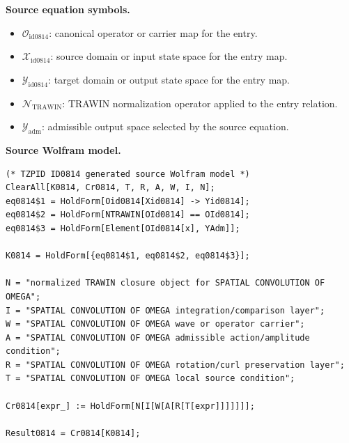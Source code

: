 \begin{minipage}[t]{0.49\linewidth}
\begingroup
\small
\raggedright
\textbf{Source equation symbols.}\par
\begin{itemize}[leftmargin=1.35em,itemsep=1pt,topsep=1pt,parsep=0pt]
    \item $\mathcal{O}_{\mathrm{id0814}}$: canonical operator or carrier map for the entry.
    \item $\mathcal{X}_{\mathrm{id0814}}$: source domain or input state space for the entry map.
    \item $\mathcal{Y}_{\mathrm{id0814}}$: target domain or output state space for the entry map.
    \item $\mathcal{N}_{\mathrm{TRAWIN}}$: TRAWIN normalization operator applied to the entry relation.
    \item $\mathcal{Y}_{\mathrm{adm}}$: admissible output space selected by the source equation.
\end{itemize}
\endgroup
\end{minipage}\hfill
\begin{minipage}[t]{0.47\linewidth}
\begingroup
\scriptsize
\raggedright
\textbf{Source Wolfram model.}\par
\begin{Verbatim}[fontsize=\tiny,breaklines=true,breakanywhere=true]
(* TZPID ID0814 generated source Wolfram model *)
ClearAll[K0814, Cr0814, T, R, A, W, I, N];
eq0814$1 = HoldForm[Oid0814[Xid0814] -> Yid0814];
eq0814$2 = HoldForm[NTRAWIN[OId0814] == OId0814];
eq0814$3 = HoldForm[Element[OId0814[x], YAdm]];

K0814 = HoldForm[{eq0814$1, eq0814$2, eq0814$3}];

N = "normalized TRAWIN closure object for SPATIAL CONVOLUTION OF OMEGA";
I = "SPATIAL CONVOLUTION OF OMEGA integration/comparison layer";
W = "SPATIAL CONVOLUTION OF OMEGA wave or operator carrier";
A = "SPATIAL CONVOLUTION OF OMEGA admissible action/amplitude condition";
R = "SPATIAL CONVOLUTION OF OMEGA rotation/curl preservation layer";
T = "SPATIAL CONVOLUTION OF OMEGA local source condition";

Cr0814[expr_] := HoldForm[N[I[W[A[R[T[expr]]]]]]];

Result0814 = Cr0814[K0814];
\end{Verbatim}
\endgroup
\end{minipage}

